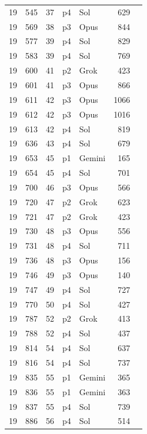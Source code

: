 \begin{longtable}{r r r l l r L{2.2in}}
19 & 545 & 37 & p4 & Sol & 629 &  \\
19 & 569 & 38 & p3 & Opus & 844 &  \\
19 & 577 & 39 & p4 & Sol & 829 &  \\
19 & 583 & 39 & p4 & Sol & 769 &  \\
19 & 600 & 41 & p2 & Grok & 423 &  \\
19 & 601 & 41 & p3 & Opus & 866 &  \\
19 & 611 & 42 & p3 & Opus & 1066 &  \\
19 & 612 & 42 & p3 & Opus & 1016 &  \\
19 & 613 & 42 & p4 & Sol & 819 &  \\
19 & 636 & 43 & p4 & Sol & 679 &  \\
19 & 653 & 45 & p1 & Gemini & 165 &  \\
19 & 654 & 45 & p4 & Sol & 701 &  \\
19 & 700 & 46 & p3 & Opus & 566 &  \\
19 & 720 & 47 & p2 & Grok & 623 &  \\
19 & 721 & 47 & p2 & Grok & 423 &  \\
19 & 730 & 48 & p3 & Opus & 556 &  \\
19 & 731 & 48 & p4 & Sol & 711 &  \\
19 & 736 & 48 & p3 & Opus & 156 &  \\
19 & 746 & 49 & p3 & Opus & 140 &  \\
19 & 747 & 49 & p4 & Sol & 727 &  \\
19 & 770 & 50 & p4 & Sol & 427 &  \\
19 & 787 & 52 & p2 & Grok & 413 &  \\
19 & 788 & 52 & p4 & Sol & 437 &  \\
19 & 814 & 54 & p4 & Sol & 637 &  \\
19 & 816 & 54 & p4 & Sol & 737 &  \\
19 & 835 & 55 & p1 & Gemini & 365 &  \\
19 & 836 & 55 & p1 & Gemini & 363 &  \\
19 & 837 & 55 & p4 & Sol & 739 &  \\
19 & 886 & 56 & p4 & Sol & 514 &  \\

\end{longtable}
